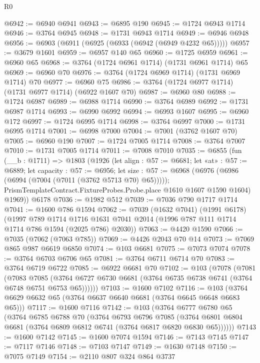 \begin{lexlean}{R0}
\begin{coremodule}
@6942 := @6940 @6941
@6943 := @6895 @190
@6945 := @1724 @6943 @1714
@6946 := @3764 @6945
@6948 := @1731 @6943 @1714
@6949 := @6946 @6948
@6956 := @6903 (@6911 (@6925 (@6933 (@6942 (@6949 @4232 @65)))))
@6957 := @3679 @1601
@6959 := @6957 @140 @65
@6960 := @1725 @6959
@6961 := @6960 @65
@6968 := @3764 (@1724 @6961 @1714) (@1731 @6961 @1714) @65
@6969 := @6960 @70
@6976 := @3764 (@1724 @6969 @1714) (@1731 @6969 @1714) @70
@6977 := @6960 @75
@6986 := @3764 (@1724 @6977 @1714) (@1731 @6977 @1714) (@6922 @1607 @70)
@6987 := @6960 @80
@6988 := @1724 @6987
@6989 := @6988 @1714
@6990 := @3764 @6989
@6992 := @1731 @6987 @1714
@6993 := @6990 @6992
@6994 := @6993 @1607
@6995 := @6960 @172
@6997 := @1724 @6995 @1714
@6998 := @3764 @6997
@7000 := @1731 @6995 @1714
@7001 := @6998 @7000
@7004 := @7001 (@3762 @1607 @70)
@7005 := @6960 @190
@7007 := @1724 @7005 @1714
@7008 := @3764 @7007
@7010 := @1731 @7005 @1714
@7011 := @7008 @7010
@7035 := @6855
    (fun (__b : @1711) =>
    @1803
      (@1926
        (let align : @57 := @6681;
        let «at» : @57 := @6889;
        let capacity : @57 := @6956;
        let size : @57 := @6968 (@6976 (@6986 (@6994 (@7004 (@7011 (@3762 @5713 @70) @65)))));
        PrismTemplateContract.FixtureProbes.Probe.place @1610 @1607 @1590 @1604)
        @1969))
    @6178
@7036 := @1982 @512
@7039 := @7036 @790 @1717 @1714
@7041 := @1600 @786 @1594
@7062 := @7039
    (@1632 @7041)
    (@1991 @6178)
    (@1997
      @789
      @1714
      @1716
      @1631
      @7041
      @2014
      (@1996 @787 @111 @1714 @1714 @786 @1594 (@2025 @786) @2030))
@7063 := @4420 @1590
@7066 := @7035 (@7062 (@7063 @785))
@7069 := @4426 @2043 @70 @14
@7073 := @7069 @865 @987 @6619 @6850
@7074 := @103 @6681
@7075 := @7073 @7074
@7078 := @3764 @6703 @6706 @65
@7081 := @3764 @6711 @6714 @70
@7083 := @3764 @6719 @6722
@7085 := @6922 @6681 @70
@7102 := @103
    (@7078
      (@7081
        (@7083
          @7085
          (@3764 @6727 @6730 @6681 (@3764 @6735 @6738 @6741 (@3764 @6748 @6751 @6753 @65))))))
@7103 := @1600 @7102
@7116 := @103 (@3764 @6629 @6632 @65 (@3764 @6637 @6640 @6681 (@3764 @6645 @6648 @6683 @65)))
@7117 := @1600 @7116
@7142 := @103
    (@3764
      @6777
      @6780
      @65
      (@3764
        @6785
        @6788
        @70
        (@3764
          @6793
          @6796
          @7085
          (@3764 @6801 @6804 @6681 (@3764 @6809 @6812 @6741 (@3764 @6817 @6820 @6830 @65))))))
@7143 := @1600 @7142
@7145 := @1600 @7074 @1594
@7146 := @7143 @7145
@7147 := @7117 @7146
@7148 := @7103 @7147
@7149 := @1630 @7148
@7150 := @7075 @7149
@7154 := @2110 @807 @324 @864 @3737

\end{coremodule}
\end{lexlean}
